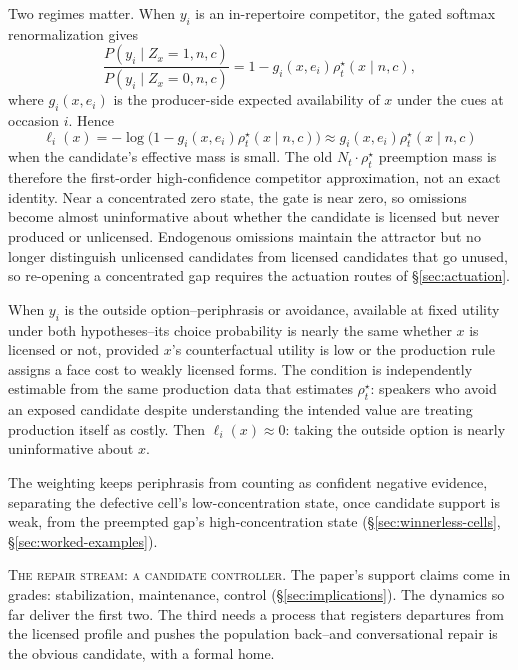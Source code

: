 \documentclass[12pt,letterpaper]{article}
\begin{document}
Two regimes matter. When $y_i$ is an in-repertoire competitor, the gated softmax
renormalization gives
\[
\frac{P(y_i\mid Z_x=1,n,c)}{P(y_i\mid Z_x=0,n,c)}
  =1-g_i(x,e_i)\rho_t^\star(x\mid n,c),
\]
where $g_i(x,e_i)$ is the producer-side expected availability of $x$ under the
cues at occasion $i$. Hence
\[
\ell_i(x)=-\log\!\bigl(1-g_i(x,e_i)\rho_t^\star(x\mid n,c)\bigr)
  \approx g_i(x,e_i)\rho_t^\star(x\mid n,c)
\]
when the candidate's effective mass is small. The old
$N_t\cdot\rho_t^\star$ preemption mass is therefore the first-order
high-confidence competitor approximation, not an exact identity. Near a
concentrated zero state, the gate is near zero, so omissions become almost
uninformative about whether the candidate is licensed but never produced or
unlicensed. Endogenous omissions maintain the attractor but no longer
distinguish unlicensed candidates from licensed candidates that go unused, so
re-opening a concentrated gap requires the actuation routes of
\S\ref{sec:actuation}.

When $y_i$ is the outside option--periphrasis or avoidance, available at fixed
utility under both hypotheses--its choice probability is nearly the same whether
$x$ is licensed or not, provided $x$'s counterfactual utility is low or the
production rule assigns a face cost to weakly licensed forms. The condition is
independently estimable from the same production data that estimates
$\rho_t^\star$: speakers who avoid an exposed candidate despite understanding
the intended value are treating production itself as costly. Then
$\ell_i(x)\approx0$: taking the outside option is nearly uninformative about
$x$.

The weighting keeps periphrasis from counting as confident negative evidence,
separating the defective cell's low-concentration state, once candidate support
is weak, from the preempted gap's high-concentration state
(\S\ref{sec:winnerless-cells},
\S\ref{sec:worked-examples}).

\noindent\textsc{The repair stream: a candidate controller.}
\label{sec:repair-controller}
The paper's support claims come in grades: stabilization, maintenance, control
(\S\ref{sec:implications}). The dynamics so far deliver the first two. The
third needs a process that registers departures from the licensed profile and
pushes the population back--and conversational repair is the obvious candidate,
with a formal home.
\end{document}
